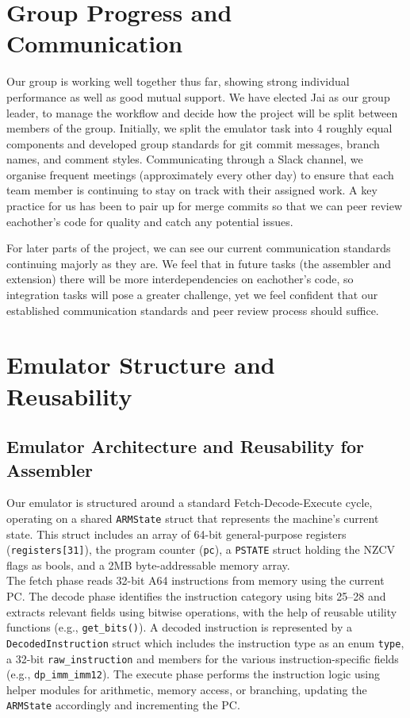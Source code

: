 \documentclass[11pt,a4paper]{article} %
\begin{document}
\section{Group Progress and Communication}
\label{sec:group-progress}

Our group is working well together thus far, showing strong individual performance as well as good mutual support. We have elected Jai as our group leader, to manage the workflow and decide how the project will be split between members of the group. Initially, we split the emulator task into 4 roughly equal components and developed group standards for git commit messages, branch names, and comment styles. Communicating through a Slack channel, we organise frequent meetings (approximately every other day) to ensure that each team member is continuing to stay on track with their assigned work. A key practice for us has been to pair up for merge commits so that we can peer review eachother’s code for quality and catch any potential issues. 

For later parts of the project, we can see our current communication standards continuing majorly as they are. We feel that in future tasks (the assembler and extension) there will be more interdependencies on eachother’s code, so integration tasks will pose a greater challenge, yet we feel confident that our established communication standards and peer review process should suffice.

\section{Emulator Structure and Reusability}
\label{sec:emulator-structure}
\subsection*{Emulator Architecture and Reusability for Assembler}

Our emulator is structured around a standard Fetch-Decode-Execute cycle, operating on a shared \texttt{ARMState} struct that represents the machine's current state. This struct includes an array of 64-bit general-purpose registers (\texttt{registers[31]}), the program counter (\texttt{pc}), a \texttt{PSTATE} struct holding the NZCV flags as bools, and a 2MB byte-addressable memory array.\\

The fetch phase reads 32-bit A64 instructions from memory using the current PC. The decode phase identifies the instruction category using bits 25–28 and extracts relevant fields using bitwise operations, with the help of reusable utility functions (e.g., \texttt{get\_bits()}). A decoded instruction is represented by a \texttt{DecodedInstruction} struct which includes the instruction type as an enum \texttt{type}, a 32-bit \texttt{raw\_instruction} and members for the various instruction-specific fields (e.g., \texttt{dp\_imm\_imm12}). The execute phase performs the instruction logic using helper modules for arithmetic, memory access, or branching, updating the \texttt{ARMState} accordingly and incrementing the PC.\\
\end{document}
